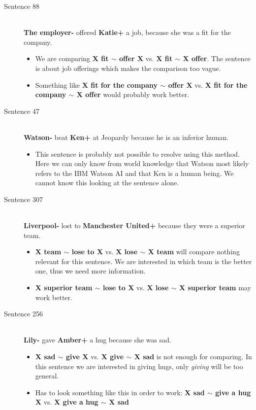 \documentclass{scrartcl}
\begin{document}
\begin{description}
  \item[Sentence 88] \hfill \\
  {\bf The employer-} offered {\bf Katie+} a job, because she was a fit for the company.
  \begin{itemize}
  	\item We are comparing {\bf X fit $\sim$ offer X} vs. {\bf X fit $\sim$ X offer}. The sentence is about job offerings which makes the comparison too vague.
  	\item Something like {\bf X fit for the company $\sim$ offer X} vs. {\bf X fit for the company $\sim$ X offer} would probably work better.
  \end{itemize}

  \item[Sentence 47] \hfill \\
  {\bf Watson-} beat {\bf Ken+} at Jeopardy because he is an inferior human.
  \begin{itemize}
  	\item This sentence is probably not possible to resolve using this method. Here we can only know from world knowledge that Watson most likely refers to the IBM Watson AI and that Ken is a human being. We cannot know this looking at the sentence alone.
  \end{itemize}

  \item[Sentence 307] \hfill \\
  {\bf Liverpool-} lost to {\bf Manchester United+} because they were a superior team.
  \begin{itemize}
  	\item {\bf X team $\sim$ lose to X} vs. {\bf X lose $\sim$ X team} will compare nothing relevant for this sentence. We are interested in which team is the better one, thus we need more information.
  	\item {\bf X superior team $\sim$ lose to X} vs. {\bf X lose $\sim$ X superior team} may work better.
  \end{itemize}

  \item[Sentence 256] \hfill \\
  {\bf Lily-} gave {\bf Amber+} a hug because she was sad.
  \begin{itemize}
  	\item {\bf X sad $\sim$ give X} vs. {\bf X give $\sim$ X sad} is not enough for comparing. In this sentence we are interested in giving hugs, only {\it giving} will be too general.
  	\item Has to look something like this in order to work: {\bf X sad $\sim$ give a hug X} vs. {\bf X give a hug $\sim$ X sad}
  \end{itemize}


\end{description}
\end{document}
